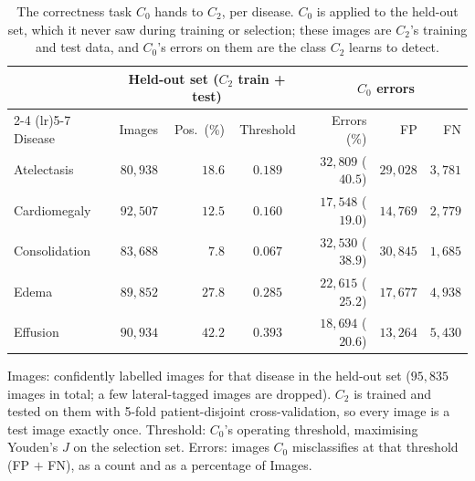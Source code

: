 \begin{table}[htbp]
\centering
\small
\caption{The correctness task $C_0$ hands to $C_2$, per disease. $C_0$ is applied to the held-out set, which it never saw during training or selection; these images are $C_2$'s training and test data, and $C_0$'s errors on them are the class $C_2$ learns to detect.}
\label{tab:c2_data}
\begin{threeparttable}
\begin{tabular}{lrrc|rrr}
\toprule
& \multicolumn{3}{c|}{Held-out set ($C_2$ train + test)} & \multicolumn{3}{c}{$C_0$ errors} \\
\cmidrule(lr){2-4} \cmidrule(lr){5-7}
Disease & Images & Pos.\ (\%) & Threshold & Errors (\%) & FP & FN \\
\midrule
Atelectasis & $80{,}938$ & $18.6$ & $0.189$ & $32{,}809$ ($40.5$) & $29{,}028$ & $3{,}781$ \\
Cardiomegaly & $92{,}507$ & $12.5$ & $0.160$ & $17{,}548$ ($19.0$) & $14{,}769$ & $2{,}779$ \\
Consolidation & $83{,}688$ & $7.8$ & $0.067$ & $32{,}530$ ($38.9$) & $30{,}845$ & $1{,}685$ \\
Edema & $89{,}852$ & $27.8$ & $0.285$ & $22{,}615$ ($25.2$) & $17{,}677$ & $4{,}938$ \\
Effusion & $90{,}934$ & $42.2$ & $0.393$ & $18{,}694$ ($20.6$) & $13{,}264$ & $5{,}430$ \\
\bottomrule
\end{tabular}
\begin{tablenotes}\footnotesize
\item Images: confidently labelled images for that disease in the held-out set ($95{,}835$ images in total; a few lateral-tagged images are dropped). $C_2$ is trained and tested on them with 5-fold patient-disjoint cross-validation, so every image is a test image exactly once. Threshold: $C_0$'s operating threshold, maximising Youden's $J$ on the selection set. Errors: images $C_0$ misclassifies at that threshold (FP $+$ FN), as a count and as a percentage of Images.
\end{tablenotes}
\end{threeparttable}
\end{table}
